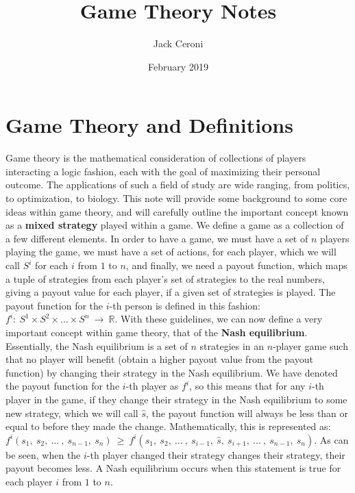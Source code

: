 \documentclass{article}
\title{Game Theory Notes}
\author{Jack Ceroni}
\date{February 2019}
\begin{document}
\maketitle
\newpage
\section{Game Theory and Definitions}
Game theory is the mathematical consideration of collections of players interacting a logic fashion, each with the goal of maximizing their personal outcome. The applications of such a field of study are wide ranging, from politics, to optimization, to biology. This note will provide some background to some core ideas within game theory, and will carefully outline the important concept known as a \textbf{mixed strategy} played within a game.
\newline\newline
We define a game as a collection of a few different elements. In order to have a game, we must have a set of $n$ players playing the game, we must have a set of actions, for each player, which we will call $S^i$ for each $i$ from $1$ to $n$, and finally, we need a payout function, which maps a tuple of strategies from each player's set of strategies to the real numbers, giving a payout value for each player, if a given set of strategies is played. The payout function for the $i$-th person is defined in this fashion: $f^i: \ S^1 \times S^2 \times ... \times S^n \ \rightarrow \ \mathbb{R}$.
\newline\newline
With these guidelines, we can now define a very important concept within game theory, that of the \textbf{Nash equilibrium}. Essentially, the Nash equilibrium is a set of $n$ strategies in an $n$-player game such that no player will benefit (obtain a higher payout value from the payout function) by changing their strategy in the Nash equilibrium. We have denoted the payout function for the $i$-th player as $f^i$, so this means that for any $i$-th player in the game, if they change their strategy in the Nash equilibrium to some new strategy, which we will call $\hat{s}$, the payout function will always be less than or equal to before they made the change. Mathematically, this is represented as: $f^i(s_1, \ s_2, \ ... \ , \ s_{n-1}, \ s_n) \ \geq \ f^i(s_1, \ s_2, \ ... \ , \ s_{i-1}, \ \hat{s}, \ s_{i+1}, \ ... \ , \ s_{n-1}, \ s_n)$. As can be seen, when the $i$-th player changed their strategy changes their strategy, their payout becomes less. A Nash equilibrium occurs when this statement is true for each player $i$ from $1$ to $n$.
\end{document}
